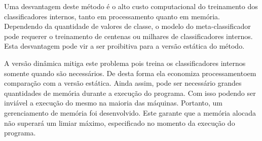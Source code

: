 Uma desvantagem deste método é o alto custo computacional do treinamento dos classificadores internos, tanto em processamento quanto em memória. Dependendo da quantidade de valores de classe, o modelo do meta-classificador pode requerer o treinamento de centenas ou milhares de classificadores internos. Esta desvantagem pode vir a ser proibitiva para a versão estática do método. 

A versão dinâmica mitiga este problema pois treina os classificadores internos somente quando são necessários. De desta forma ela economiza processamentoem comparação com a versão estática. Ainda assim, pode ser necessário grandes quantidades de memória durante a execução do programa. Com isso podendo ser inviável a execução do mesmo na maioria das máquinas. Portanto, um gerenciamento de memória foi desenvolvido. Este garante que a memória alocada não superará um limiar máximo, especificado no momento da execução do programa.